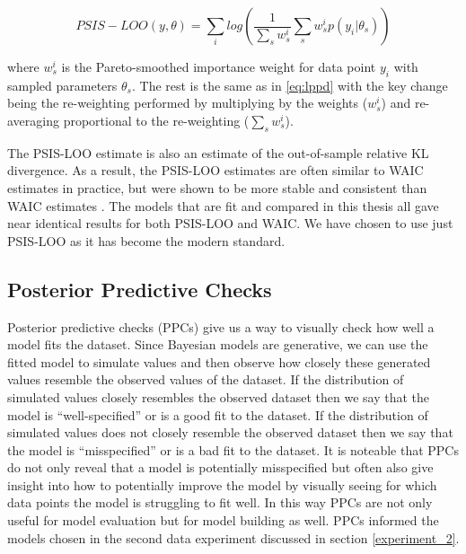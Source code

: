 \begin{equation} \label{eq:psis-loo}
PSIS-LOO(y, \theta) = \sum_i log \left( \frac{1}{\sum_s w_s^i} \sum_s w_s^i p(y_i | \theta_s) \right)
\end{equation}

where $w_s^i$ is the Pareto-smoothed importance weight for data point $y_i$ with sampled parameters $\theta_s$. The rest is the same as in \ref{eq:lppd} with the key change being the re-weighting performed by multiplying by the weights ($w_s^i$) and re-averaging proportional to the re-weighting ($\sum_s w_s^i$).

The PSIS-LOO estimate is also an estimate of the out-of-sample relative KL divergence. As a result, the PSIS-LOO estimates are often similar to WAIC estimates in practice, but were shown to be more stable and consistent than WAIC estimates \cite{Vehtari2016}. The models that are fit and compared in this thesis all gave near identical results for both PSIS-LOO and WAIC. We have chosen to use just PSIS-LOO as it has become the modern standard.

\subsection{Posterior Predictive Checks} \label{ppc}

Posterior predictive checks (PPCs) give us a way to visually check how well a model fits the dataset. Since Bayesian models are generative, we can use the fitted model to simulate values and then observe how closely these generated values resemble the observed values of the dataset. If the distribution of simulated values closely resembles the observed dataset then we say that the model is ``well-specified'' or is a good fit to the dataset. If the distribution of simulated values does not closely resemble the observed dataset then we say that the model is ``misspecified'' or is a bad fit to the dataset. It is noteable that PPCs do not only reveal that a model is potentially misspecified but often also give insight into how to potentially improve the model by visually seeing for which data points the model is struggling to fit well. In this way PPCs are not only useful for model evaluation but for model building as well. PPCs informed the models chosen in the second data experiment discussed in section \ref{experiment_2}.
